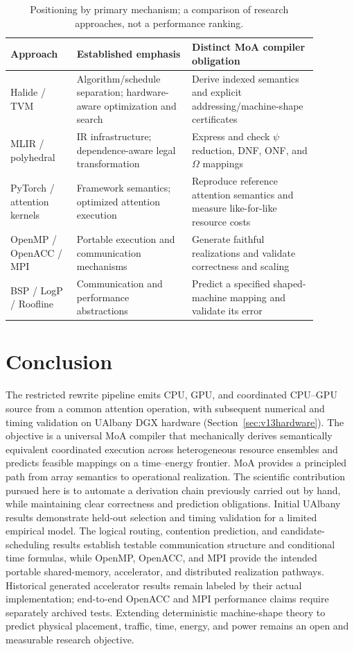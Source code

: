 \documentclass[11pt]{article}
\begin{document}
\begin{table}[htbp]\centering\small
\caption{Positioning by primary mechanism; a comparison of research approaches, not a performance ranking.}\label{tab:related-position}
\begin{tabular}{p{0.19\linewidth}p{0.33\linewidth}p{0.36\linewidth}}\toprule
Approach & Established emphasis & Distinct MoA compiler obligation \\\midrule
Halide / TVM & Algorithm/schedule separation; hardware-aware optimization and search & Derive indexed semantics and explicit addressing/machine-shape certificates \\
MLIR / polyhedral & IR infrastructure; dependence-aware legal transformation & Express and check $\psi$ reduction, DNF, ONF, and $\Omega$ mappings \\
PyTorch / attention kernels & Framework semantics; optimized attention execution & Reproduce reference attention semantics and measure like-for-like resource costs \\
OpenMP / OpenACC / MPI & Portable execution and communication mechanisms & Generate faithful realizations and validate correctness and scaling \\
BSP / LogP / Roofline & Communication and performance abstractions & Predict a specified shaped-machine mapping and validate its error \\\bottomrule
\end{tabular}
\end{table}

\section{Conclusion}
The restricted rewrite pipeline emits CPU, GPU, and coordinated CPU--GPU source from a common attention operation, with subsequent numerical and timing validation on UAlbany DGX hardware (Section~\ref{sec:v13hardware}). The objective is a universal MoA compiler that mechanically derives semantically equivalent coordinated execution across heterogeneous resource ensembles and predicts feasible mappings on a time--energy frontier. MoA provides a principled path from array semantics to operational realization. The scientific contribution pursued here is to automate a derivation chain previously carried out by hand, while maintaining clear correctness and prediction obligations. Initial UAlbany results demonstrate held-out selection and timing validation for a limited empirical model. The logical routing, contention prediction, and candidate-scheduling results establish testable communication structure and conditional time formulas, while OpenMP, OpenACC, and MPI provide the intended portable shared-memory, accelerator, and distributed realization pathways. Historical generated accelerator results remain labeled by their actual implementation; end-to-end OpenACC and MPI performance claims require separately archived tests. Extending deterministic machine-shape theory to predict physical placement, traffic, time, energy, and power remains an open and measurable research objective.
\end{document}
